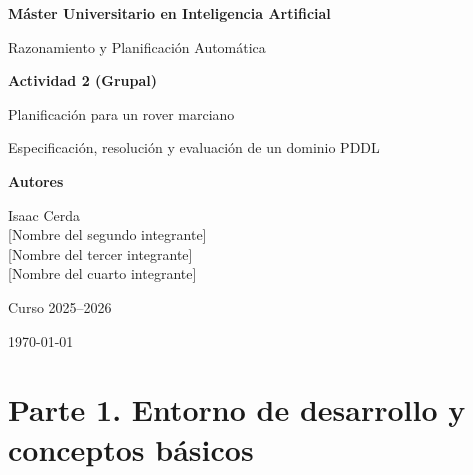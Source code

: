 \documentclass[12pt,a4paper]{article}
\begin{document}
\begin{titlepage}
\centering
\vspace*{2cm}

{\Large\bfseries M\'aster Universitario en Inteligencia Artificial\par}
\vspace{0.4cm}
{\large Razonamiento y Planificaci\'on Autom\'atica\par}

\vspace{2.5cm}
{\Huge\bfseries Actividad 2 (Grupal)\par}
\vspace{0.6cm}
{\LARGE Planificaci\'on para un rover marciano\par}
\vspace{0.4cm}
{\large Especificaci\'on, resoluci\'on y evaluaci\'on de un dominio PDDL\par}

\vspace{3cm}
{\large\bfseries Autores\par}
\vspace{0.3cm}
{\large
Isaac Cerda\\[2pt]
[Nombre del segundo integrante]\\[2pt]
[Nombre del tercer integrante]\\[2pt]
[Nombre del cuarto integrante]\par}

\vfill
{\large Curso 2025--2026\par}
\vspace{0.3cm}
{\large \today\par}
\end{titlepage}

\setcounter{page}{1}

\section{Parte 1. Entorno de desarrollo y conceptos b\'asicos}
\end{document}
